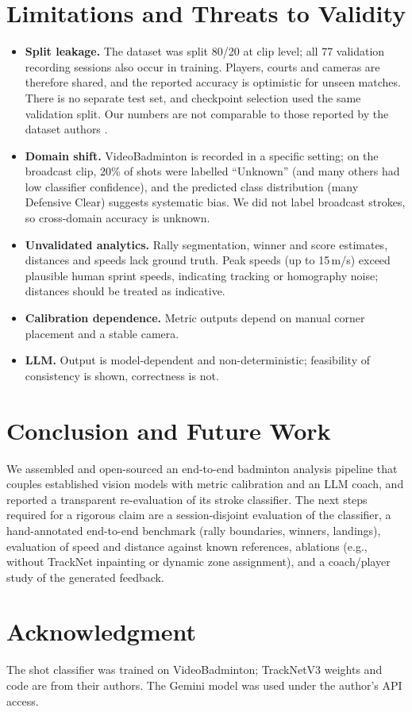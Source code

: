 \documentclass[10pt,journal]{IEEEtran}
\begin{document}
\section{Limitations and Threats to Validity}\label{sec:limits}
\begin{itemize}
\item \textbf{Split leakage.} The dataset was split 80/20 at clip level; all 77 validation recording sessions also occur in training. Players, courts and cameras are therefore shared, and the reported accuracy is optimistic for unseen matches. There is no separate test set, and checkpoint selection used the same validation split. Our numbers are not comparable to those reported by the dataset authors \cite{li2024videobadminton}.
\item \textbf{Domain shift.} VideoBadminton is recorded in a specific setting; on the broadcast clip, 20\% of shots were labelled ``Unknown'' (and many others had low classifier confidence), and the predicted class distribution (many Defensive Clear) suggests systematic bias. We did not label broadcast strokes, so cross-domain accuracy is unknown.
\item \textbf{Unvalidated analytics.} Rally segmentation, winner and score estimates, distances and speeds lack ground truth. Peak speeds (up to 15\,m/s) exceed plausible human sprint speeds, indicating tracking or homography noise; distances should be treated as indicative.
\item \textbf{Calibration dependence.} Metric outputs depend on manual corner placement and a stable camera.
\item \textbf{LLM.} Output is model-dependent and non-deterministic; feasibility of consistency is shown, correctness is not.
\end{itemize}

\section{Conclusion and Future Work}
We assembled and open-sourced an end-to-end badminton analysis pipeline that couples established vision models with metric calibration and an LLM coach, and reported a transparent re-evaluation of its stroke classifier. The next steps required for a rigorous claim are a session-disjoint evaluation of the classifier, a hand-annotated end-to-end benchmark (rally boundaries, winners, landings), evaluation of speed and distance against known references, ablations (e.g., without TrackNet inpainting or dynamic zone assignment), and a coach/player study of the generated feedback.

\section*{Acknowledgment}
The shot classifier was trained on VideoBadminton; TrackNetV3 weights and code are from their authors. The Gemini model was used under the author's API access.



\end{document}

